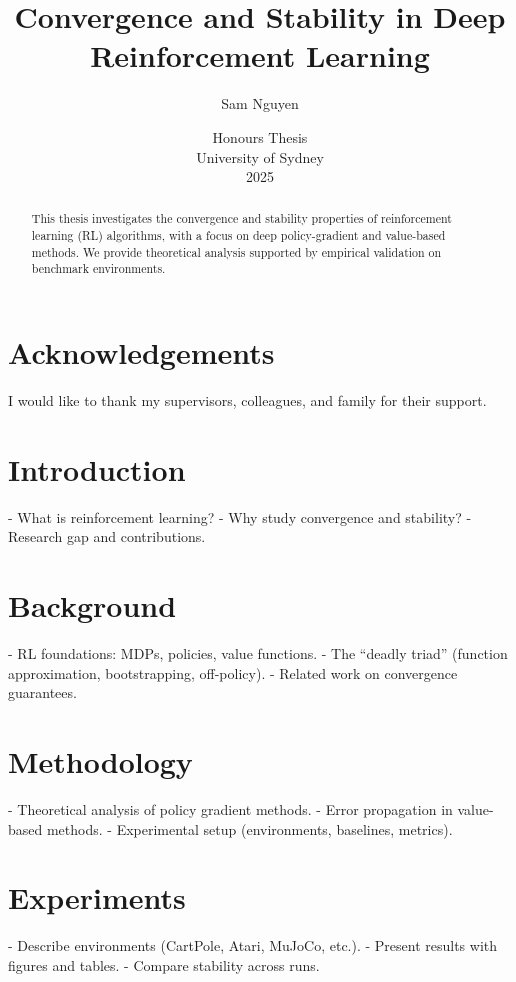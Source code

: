 \documentclass[12pt,a4paper]{report}
\title{Convergence and Stability in Deep Reinforcement Learning}
\author{Sam Nguyen}
\date{Honours Thesis \\ University of Sydney \\ 2025}
\begin{document}
\maketitle

\begin{abstract}
This thesis investigates the convergence and stability properties of reinforcement learning (RL) algorithms, with a focus on deep policy-gradient and value-based methods. We provide theoretical analysis supported by empirical validation on benchmark environments.
\end{abstract}

\chapter*{Acknowledgements}
I would like to thank my supervisors, colleagues, and family for their support.

\tableofcontents
\listoffigures
\listoftables


\chapter{Introduction}
- What is reinforcement learning?  
- Why study convergence and stability?  
- Research gap and contributions.  

\chapter{Background}
- RL foundations: MDPs, policies, value functions.  
- The “deadly triad” (function approximation, bootstrapping, off-policy).  
- Related work on convergence guarantees.  

\chapter{Methodology}
- Theoretical analysis of policy gradient methods.  
- Error propagation in value-based methods.  
- Experimental setup (environments, baselines, metrics).  

\chapter{Experiments}
- Describe environments (CartPole, Atari, MuJoCo, etc.).  
- Present results with figures and tables.  
- Compare stability across runs.  
\end{document}
